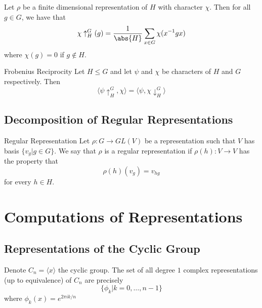 \documentclass[a4paper]{article}
\begin{document}
\begin{lmm}{}{} Let $\rho$ be a finite dimensional representation of $H$ with character $\chi$. Then for all $g\in G$, we have that $$\chi\uparrow_H^G(g)=\frac{1}{\abs{H}}\sum_{x\in G}\chi(x^{-1}gx)$$ where $\chi(g)=0$ if $g\notin H$. 
\end{lmm}

\begin{thm}{Frobenius Reciprocity}{} Let $H\leq G$ and let $\psi$ and $\chi$ be characters of $H$ and $G$ respectively. Then $$\langle\psi\uparrow_H^G,\chi\rangle=\langle\psi,\chi\downarrow_H^G\rangle$$
\end{thm}







\subsection{Decomposition of Regular Representations}
\begin{defn}{Regular Representation}{} Let $\rho:G\to GL(V)$ be a representation such that $V$ has basis $\{v_g|g\in G\}$. We say that $\rho$ is a regular representation if $\rho(h):V\to V$ has the property that $$\rho(h)(v_g)=v_{hg}$$ for every $h\in H$. 
\end{defn}




\pagebreak
\section{Computations of Representations}
\subsection{Representations of the Cyclic Group}
\begin{prp}{}{} Denote $C_n=\langle x\rangle$ the cyclic group. The set of all degree $1$ complex representations (up to equivalence) of $C_n$ are precisely $$\{\phi_k|k=0,\dots,n-1\}$$ where $\phi_k(x)=e^{2\pi i k/n}$
\end{prp}
\end{document}
